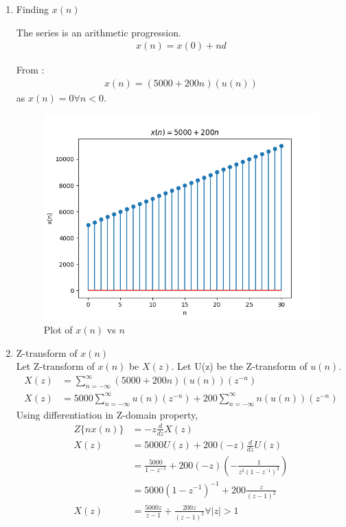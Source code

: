 \documentclass[journal,12pt,twocolumn]{IEEEtran}
\theoremstyle{remark}
\begin{document}
\begin{enumerate}
\item Finding $x(n)$

The series is an arithmetic progression.
\begin{align}
x(n) = x(0) + nd
\end{align}

From :
\begin{align}
x(n) = (5000 + 200n)(u(n))
\end{align}
as $x(n) = 0 \forall n < 0$.

\begin{figure}[h!]
    \centering
    \includegraphics[width=\columnwidth]{figs/10_5_2_19.png}
    \caption{Plot of $x(n)$ vs $n$}
    \label{fig:1}
\end{figure}

\item Z-transform of $x(n)$ \\
Let Z-transform of $x(n)$ be $X(z)$. Let U(z) be the Z-transform of $u(n)$.
\begin{align}
X(z) &= \sum_{n = -\infty}^{\infty} (5000 + 200n)(u(n))(z^{-n}) \\
X(z) &= 5000\sum_{n = -\infty}^{\infty} u(n)(z^{-n}) + 200\sum_{n = -\infty}^{\infty}n(u(n))(z^{-n})
\end{align}
Using differentiation in Z-domain property,
\begin{align}
Z\{nx(n)\} &= -z\frac{d}{dz}X(z) \\
X(z) &= 5000U(z) + 200(-z)\frac{d}{dz} U(z) \\
&= \frac{5000}{1 - z^{-1}} + 200(-z)(-\frac{1}{z^2(1 -z^{^-1})^2}) \\
&= 5000(1 - z^{-1})^{-1} + 200\frac{z}{(z - 1)^2} \\
X(z) &= \frac{5000z}{z - 1} + \frac{200z}{(z - 1)^2} \forall |z| > 1
\end{align}

\end{enumerate}
\end{document}
